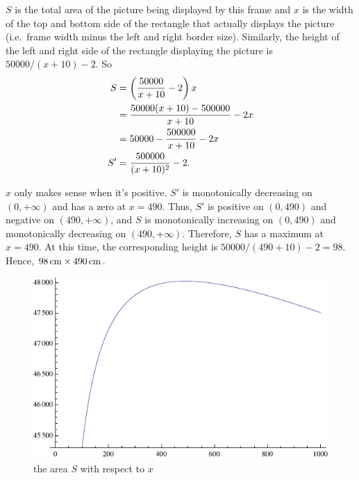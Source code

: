     {\parasp $S$ is the total area of the picture being displayed by this frame
    and $x$ is the width of the top and bottom side of the rectangle that
    actually displays the picture (i.e.\ frame width minus the left and right
    border size). Similarly, the height of the left and right side of the
    rectangle displaying the picture is $50000/(x+10) - 2$. So
    \begin{align*}
      S &= \left( \frac{50000}{x+10} - 2 \right)x \\
        &= \frac{50000(x+10) - 500000}{x+10} - 2x \\
        &= 50000 - \frac{500000}{x+10} - 2x \\
      S' &= \frac{500000}{(x+10)^2} - 2.
    \end{align*}
    
    $x$ only makes sense when it's positive. $S'$ is monotonically
    decreasing on $(0,+\infty)$ and has a zero at $x=490$. Thus, $S'$ is
    positive on $(0,490)$ and negative on $(490,+\infty)$, and $S$ is
    monotonically increasing on $(0,490)$ and monotonically decreasing on
    $(490,+\infty)$. Therefore, $S$ has a maximum at $x=490$. At this time,
    the corresponding height is $50000/(490+10) - 2 = 98$. Hence, $98 \,\mathrm{cm}
    \times 490 \,\mathrm{cm}$.
    
    \begin{figure}[h]
      \centering
      \includegraphics{quiz2_solved_fig1}
      \caption{the area $S$ with respect to $x$}
    \end{figure}
    
}

